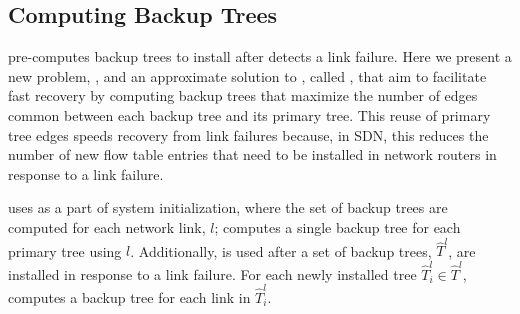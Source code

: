 \subsection{Computing Backup Trees}
\label{subsec:min-control}

\mdr pre-computes backup trees to install after \pcnt detects a link failure.  Here we present a new problem, \mcs, and an approximate solution to \mcs, called \steiners, that aim to facilitate fast
recovery by computing backup trees that maximize the number of edges common between each backup tree and its primary tree.  This reuse of primary tree edges speeds recovery from link
failures because, in SDN, this reduces the number of new flow table entries that need to be installed in network routers in response to a link failure.

\mdr uses \steiner as a part of system initialization, where the set of backup trees are computed for each network link, $l$; \mdr computes a single backup tree for each primary tree using $l$. 
Additionally, \steiner is used after a set of backup trees, $\hat{T}^l$, are installed in response to a link failure.  For each newly installed tree $\hat{T}^l_i \in \hat{T}^l$, \mdr computes 
a backup tree for each link in $\hat{T}^l_i$.




